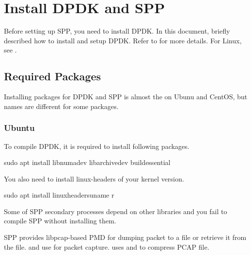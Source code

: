 \documentclass[a4paper,11pt,openany,oneside,english]{sphinxmanual}
\begin{document}
\section{Install DPDK and SPP}
\label{\detokenize{gsg/install:install-dpdk-and-spp}}\label{\detokenize{gsg/install:setup-install-dpdk-spp}}\label{\detokenize{gsg/install::doc}}
Before setting up SPP, you need to install DPDK.
In this document, briefly described how to install and setup DPDK.
Refer to  for more details.
For Linux, see  .


\subsection{Required Packages}
\label{\detokenize{gsg/install:required-packages}}\label{\detokenize{gsg/install:setup-install-packages}}
Installing packages for DPDK and SPP is almost the on Ubunu and CentOS,
but names are different for some packages.


\subsubsection{Ubuntu}
\label{\detokenize{gsg/install:ubuntu}}
To compile DPDK, it is required to install following packages.

\begin{sphinxVerbatim}[commandchars=\\\{\},formatcom=\footnotesize]
 sudo apt install libnuma\PYGZhy{}dev 
  libarchive\PYGZhy{}dev 
  build\PYGZhy{}essential
\end{sphinxVerbatim}

You also need to install linux-headers of your kernel version.

\begin{sphinxVerbatim}[commandchars=\\\{\},formatcom=\footnotesize]
 sudo apt install linux\PYGZhy{}headers\PYGZhy{}uname \PYGZhy{}r
\end{sphinxVerbatim}

Some of SPP secondary processes depend on other libraries and you fail to
compile SPP without installing them.

SPP provides libpcap-based PMD for dumping packet to a file or retrieve
it from the file.
 and  use  for packet capture.
 uses  and  to compress PCAP file.
\end{document}
